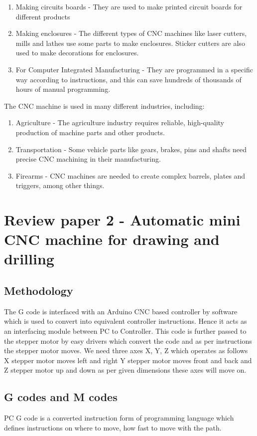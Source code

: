 \begin{enumerate}
 \item Making circuits boards - They are used to make printed circuit boards for different products
 \item Making enclosures - The different types of CNC machines like laser cutters, mills and lathes use some parts to make enclosures. Sticker cutters are also used to make decorations for enclosures.
 \item For Computer Integrated Manufacturing - They are programmed in a specific way according to instructions, and this can save hundreds of thousands of hours of manual programming.
\end{enumerate}

The CNC machine is used in many different industries, including:

\begin{enumerate}
 \item Agriculture - The agriculture industry requires reliable, high-quality production of machine parts and other products.
 \item Transportation - Some vehicle parts like gears, brakes, pins and shafts need precise CNC machining in their manufacturing.
 \item Firearms - CNC machines are needed to create complex barrels, plates and triggers, among other things.
\end{enumerate}

\section{Review paper 2 - Automatic mini CNC machine for drawing and drilling}

\subsection{Methodology}
The G code is interfaced with an Arduino CNC based controller by software which is used to convert into equivalent controller instructions. Hence it acts as an interfacing module between PC to Controller. This code is further passed to the stepper motor by easy drivers which convert the code and as per instructions the stepper motor moves. We need three axes X, Y, Z which operates as follows X stepper motor moves left and right Y stepper motor moves front and back and Z stepper motor up and down as per given dimensions these axes will move on.

\subsection{G codes and M codes}
PC G code is a converted instruction form of programming language which defines instructions on where to move, how fast to move with the path.

